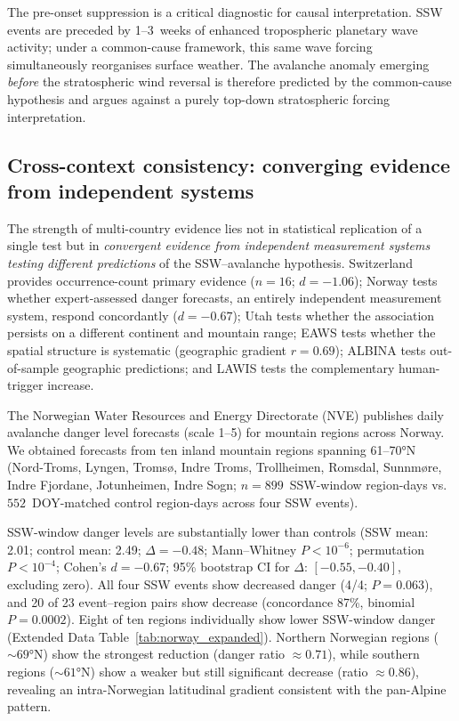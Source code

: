 \documentclass[11pt,letterpaper]{article}
\begin{document}
The pre-onset suppression is a critical diagnostic for causal interpretation. SSW events are preceded by 1--3~weeks of enhanced tropospheric planetary wave activity\cite{Polvani2004}; under a common-cause framework, this same wave forcing simultaneously reorganises surface weather. The avalanche anomaly emerging \emph{before} the stratospheric wind reversal is therefore predicted by the common-cause hypothesis and argues against a purely top-down stratospheric forcing interpretation.

\subsection*{Cross-context consistency: converging evidence from independent systems}

The strength of multi-country evidence lies not in statistical replication of a single test but in \emph{convergent evidence from independent measurement systems testing different predictions} of the SSW--avalanche hypothesis. Switzerland provides occurrence-count primary evidence ($n = 16$; $d = -1.06$); Norway tests whether expert-assessed danger forecasts, an entirely independent measurement system, respond concordantly ($d = -0.67$); Utah tests whether the association persists on a different continent and mountain range; EAWS tests whether the spatial structure is systematic (geographic gradient $r = 0.69$); ALBINA tests out-of-sample geographic predictions; and LAWIS tests the complementary human-trigger increase.

The Norwegian Water Resources and Energy Directorate (NVE) publishes daily avalanche danger level forecasts (scale 1--5) for mountain regions across Norway. We obtained forecasts from ten inland mountain regions spanning 61--70°N (Nord-Troms, Lyngen, Tromsø, Indre Troms, Trollheimen, Romsdal, Sunnmøre, Indre Fjordane, Jotunheimen, Indre Sogn; $n = 899$~SSW-window region-days vs.\ $552$~DOY-matched control region-days across four SSW events).

SSW-window danger levels are substantially lower than controls (SSW mean: 2.01; control mean: 2.49; $\Delta = -0.48$; Mann--Whitney $P < 10^{-6}$; permutation $P < 10^{-4}$; Cohen's $d = -0.67$; 95\% bootstrap CI for $\Delta$: $[-0.55, -0.40]$, excluding zero). All four SSW events show decreased danger (4/4; $P = 0.063$), and 20 of 23 event--region pairs show decrease (concordance 87\%, binomial $P = 0.0002$). Eight of ten regions individually show lower SSW-window danger (Extended Data Table~\ref{tab:norway_expanded}). Northern Norwegian regions (${\sim}69$°N) show the strongest reduction (danger ratio $\approx 0.71$), while southern regions (${\sim}61$°N) show a weaker but still significant decrease (ratio $\approx 0.86$), revealing an intra-Norwegian latitudinal gradient consistent with the pan-Alpine pattern.
\end{document}

